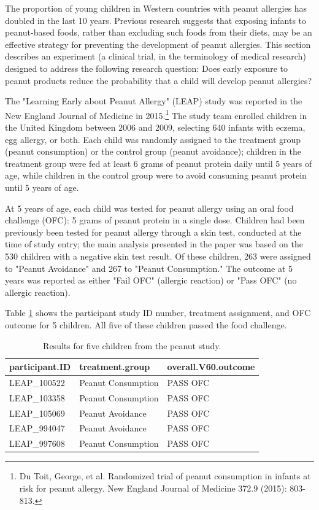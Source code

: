 \begin{doublespace}
The proportion of young children in Western countries with peanut allergies has doubled in the last 10 years. Previous research suggests that exposing infants to peanut-based foods, rather than excluding such foods from their diets, may be an effective strategy for preventing the development of peanut allergies. This section describes an experiment (a clinical trial, in the terminology of medical research) designed to address the following research question: Does early exposure to peanut products reduce the probability that a child will develop peanut allergies? 

The "Learning Early about Peanut Allergy" (LEAP) study was reported in the New England Journal of Medicine in 2015.\footnote{Du Toit, George, et al. Randomized trial of peanut consumption in infants at risk for peanut allergy. New England Journal of Medicine 372.9 (2015): 803-813.} The study team enrolled children in the United Kingdom between 2006 and 2009, selecting 640 infants with eczema, egg allergy, or both. Each child was randomly assigned to the treatment group (peanut consumption) or the control group (peanut avoidance); children in the treatment group were fed at least 6 grams of peanut protein daily until 5 years of age, while children in the control group were to avoid consuming peanut protein until 5 years of age. 

At 5 years of age, each child was tested for peanut allergy using an oral food challenge (OFC): 5 grams of peanut protein in a single dose. Children had been previously been tested for peanut allergy through a skin test, conducted at the time of study entry; the main analysis presented in the paper was based on the 530 children with a negative skin test result. Of these children, 263 were assigned to "Peanut Avoidance" and 267 to "Peanut Consumption." The outcome at 5 years was reported as either "Fail OFC" (allergic reaction) or "Pass OFC" (no allergic reaction). 

Table \ref{leapStudyResultsDF} shows the participant study ID number, treatment assignment, and OFC outcome for 5 children. All five of these children passed the food challenge. 
 

\begin{table}[ht]
\centering
\begin{tabular}{lll}
  \hline
participant.ID & treatment.group & overall.V60.outcome \\ 
  \hline
LEAP\_100522 & Peanut Consumption & PASS OFC \\ 
  LEAP\_103358 & Peanut Consumption & PASS OFC \\ 
  LEAP\_105069 & Peanut Avoidance & PASS OFC \\ 
  LEAP\_994047 & Peanut Avoidance & PASS OFC \\ 
  LEAP\_997608 & Peanut Consumption & PASS OFC \\ 
   \hline
\end{tabular}
\caption{Results for five children from the peanut study.}
\label{leapStudyResultsDF}
\end{table}


\end{doublespace}
